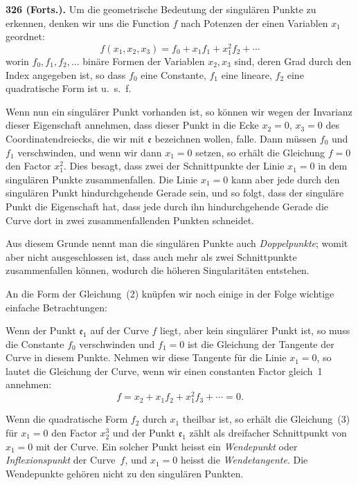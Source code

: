 \documentclass[12pt,a4paper]{article}
\begin{document}
\bigskip
\noindent\textbf{326 (Forts.).} Um die geometrische Bedeutung der singul\"aren Punkte zu erkennen, denken wir uns die Function $f$ nach Potenzen der einen Variablen $x_1$ geordnet:
\begin{equation}
\tag{2}
f(x_1,x_2,x_3) = f_0 + x_1 f_1 + x_1^2 f_2 + \cdots
\end{equation}
worin $f_0,f_1,f_2,\ldots$ bin\"are Formen der Variablen $x_2,x_3$ sind, deren Grad durch den Index angegeben ist, so dass $f_0$ eine Constante, $f_1$ eine lineare, $f_2$ eine quadratische Form ist u.~s.~f.

Wenn nun ein singul\"arer Punkt vorhanden ist, so k\"onnen wir wegen der Invarianz dieser Eigenschaft annehmen, dass dieser Punkt in die Ecke $x_2=0$, $x_3=0$ des Coordinatendreiecks, die wir mit $\mathfrak{e}$ bezeichnen wollen, falle. Dann m\"ussen $f_0$ und $f_1$ verschwinden, und wenn wir dann $x_1=0$ setzen, so erh\"alt die Gleichung $f=0$ den Factor $x_1^2$. Dies besagt, dass zwei der Schnittpunkte der Linie $x_1=0$ in dem singul\"aren Punkte zusammenfallen. Die Linie $x_1=0$ kann aber jede durch den singul\"aren Punkt hindurchgehende Gerade sein, und so folgt, dass der singul\"are Punkt die Eigenschaft hat, dass jede durch ihn hindurchgehende Gerade die Curve dort in zwei zusammenfallenden Punkten schneidet.

Aus diesem Grunde nennt man die singul\"aren Punkte auch \emph{Doppelpunkte}; womit aber nicht ausgeschlossen ist, dass auch mehr als zwei Schnittpunkte zusammenfallen k\"onnen, wodurch die h\"oheren Singularit\"aten entstehen.

An die Form der Gleichung~(2) kn\"upfen wir noch einige in der Folge wichtige einfache Betrachtungen:

Wenn der Punkt $\mathfrak{e}_1$ auf der Curve $f$ liegt, aber kein singul\"arer Punkt ist, so muss die Constante $f_0$ verschwinden und $f_1=0$ ist die Gleichung der Tangente der Curve in diesem Punkte. Nehmen wir diese Tangente f\"ur die Linie $x_1=0$, so lautet die Gleichung der Curve, wenn wir einen constanten Factor gleich~1 annehmen:
\begin{equation}
\tag{3}
f = x_2 + x_1 f_2 + x_1^2 f_3 + \cdots = 0.
\end{equation}

Wenn die quadratische Form $f_2$ durch $x_1$ theilbar ist, so erh\"alt die Gleichung~(3) f\"ur $x_1=0$ den Factor $x_2^3$ und der Punkt $\mathfrak{e}_1$ z\"ahlt als dreifacher Schnittpunkt von $x_1=0$ mit der Curve. Ein solcher Punkt heisst ein \emph{Wendepunkt} oder \emph{Inflexionspunkt} der Curve~$f$, und $x_1=0$ heisst die \emph{Wendetangente}. Die Wendepunkte geh\"oren nicht zu den singul\"aren Punkten.
\end{document}
